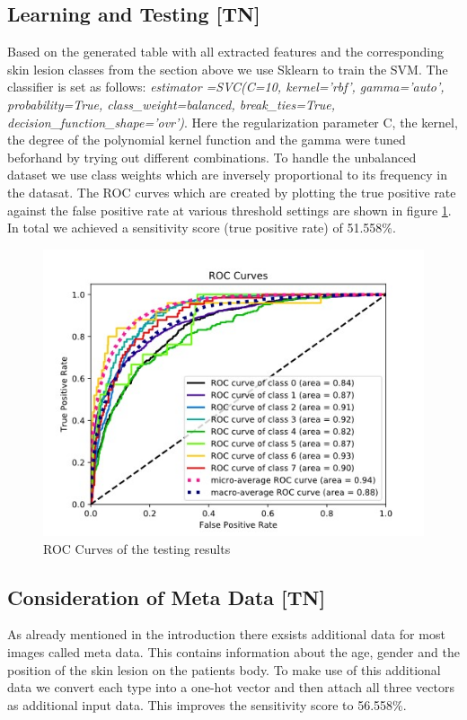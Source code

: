 \subsection{Learning and Testing [TN]}
Based on the generated table with all extracted features and the corresponding skin lesion classes from the section above we use Sklearn to train the SVM. The classifier is set as follows: \textit{estimator =SVC(C=10, kernel='rbf', gamma='auto', probability=True, class\_weight=\glqq balanced\grqq, break\_ties=True, decision\_function\_shape='ovr')}. Here the regularization parameter C, the kernel, the degree of the polynomial kernel function and the gamma were tuned beforhand by trying out different combinations. To handle the unbalanced dataset we use class weights which are inversely proportional to its frequency in the datasat.\newline
The ROC curves which are created by plotting the true positive rate against the false positive rate at various threshold settings are shown in figure \ref{SVM_ROC}. In total we achieved a sensitivity score (true positive rate) of 51.558\%.
\begin{figure}
	\centering
	\includegraphics[width=1\linewidth]{pictures/SVM_ROC.jpg}  
	\caption{ROC Curves of the testing results}
	\label{SVM_ROC}
\end{figure}

\subsection{Consideration of Meta Data [TN]}
As already mentioned in the introduction there exsists additional data for most images called meta data. This contains information about the age, gender and the position of the skin lesion on the patients body. To make use of this additional data we convert each type into a one-hot vector and then attach all three vectors as additional input data. This improves the sensitivity score to 56.558\%.


